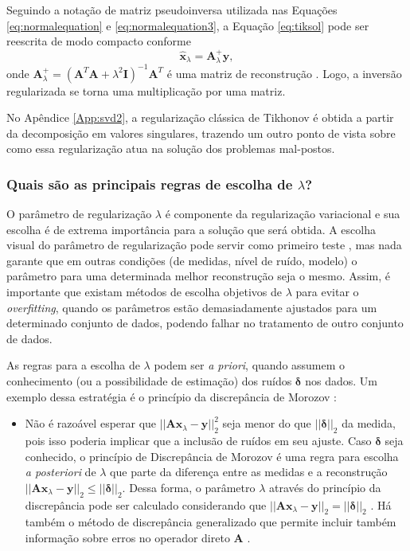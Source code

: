 Seguindo a notação de matriz pseudoinversa utilizada nas Equações \eqref{eq:normalequation} e \eqref{eq:normalequation3}, a Equação \eqref{eq:tiksol} pode ser reescrita de modo compacto conforme  
\begin{equation}
\hat{\mathbf{x}}_{\lambda} = \mathbf{A}^+_{\lambda} \mathbf{y},
\label{eq:tiksol2}
\end{equation}
onde $\mathbf{A}^+_{\lambda} = \left( \mathbf{A}^T \mathbf{A} + \lambda^2 \mathbf{I} \right)^{-1} \mathbf{A}^T $ é uma matriz de reconstrução \cite{Adler2019}. Logo, a inversão regularizada se torna uma multiplicação por uma matriz. 

No Apêndice \ref{App:svd2}, a regularização clássica de Tikhonov é obtida a partir da decomposição em valores singulares, trazendo um outro ponto de vista sobre como essa regularização atua na solução dos problemas mal-postos.


\subsubsection{Quais são as principais regras de escolha de $\lambda$?}

O parâmetro de regularização $\lambda$ é componente da regularização variacional e sua escolha é de extrema importância para a solução que será obtida. A escolha visual do parâmetro de regularização pode servir como primeiro teste \cite[pág. 199]{bovik2005handbook}, mas nada garante que em outras condições (de medidas, nível de ruído, modelo) o parâmetro para uma determinada melhor reconstrução seja o mesmo.  Assim, é importante que existam métodos de escolha objetivos de $\lambda$ para evitar o \textit{overfitting}, quando os parâmetros estão demasiadamente ajustados para um determinado conjunto de dados, podendo falhar no tratamento de outro conjunto de dados. 

As regras para a escolha de $\lambda$ podem ser \textit{a priori}, quando assumem o conhecimento (ou a possibilidade de estimação) dos ruídos $\bm{\delta}$ nos dados. Um exemplo dessa estratégia é o  princípio da discrepância de Morozov \cite[págs. 83-4]{engl1996regularization}:
\begin{itemize} 
\item Não é razoável esperar que $\vert \vert \mathbf{A} \mathbf{x}_{\lambda} - \mathbf{y} \vert \vert^2_2$ seja menor do que $\vert\vert\bm{\delta}\vert\vert_2$ da medida, pois isso poderia implicar que a inclusão de ruídos em seu ajuste. Caso $\bm{\delta}$ seja conhecido, o princípio de Discrepância de Morozov é uma regra para escolha \textit{a posteriori} de $\lambda$ que parte da diferença entre as medidas e a reconstrução $\vert \vert \mathbf{A} \mathbf{x}_{\lambda} - \mathbf{y} \vert \vert_2 \leq \vert\vert\bm{\delta}\vert\vert_2$. Dessa forma, o parâmetro $\lambda$ através do princípio da discrepância pode ser calculado considerando que $\vert \vert \mathbf{A} \mathbf{x}_{\lambda} - \mathbf{y} \vert \vert_2 = \vert\vert\bm{\delta}\vert\vert_2$ \cite[pág. 90]{hansen2010discrete}. Há também o método de discrepância generalizado que permite incluir também informação sobre erros no operador direto $\mathbf{A}$ \cite[pág. 179-81]{Hansen1998}.
\end{itemize} 

